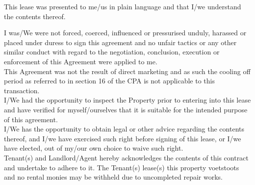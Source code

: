 \documentclass[11pt]{article}
\begin{document}
This lease was presented to me/us in plain language and that I/we understand the contents thereof.

I was/We were not forced, coerced, influenced or pressurised unduly, harassed or placed under duress to sign this agreement and no unfair tactics or any other similar conduct with regard to the negotiation, conclusion, execution or enforcement of this Agreement were applied to me. \\

This Agreement was not the result of direct marketing and as such the cooling off period as referred to in section 16 of the CPA is not applicable to this transaction. \\

I/We had the opportunity to inspect the Property prior to entering into this lease and have verified for myself/ourselves that it is suitable for the intended purpose of this agreement. \\

I/We has the opportunity to obtain legal or other advice regarding the contents thereof, and I/we have exercised such right before signing of this lease, or I/we have elected, out of my/our own choice to waive such right. \\

Tenant(s) and Landlord/Agent hereby acknowledges the contents of this contract and undertake to adhere to it. The Tenant(s) lease(s) this property voetstoots and no rental monies may be withheld due to uncompleted repair works.

\end{document}
